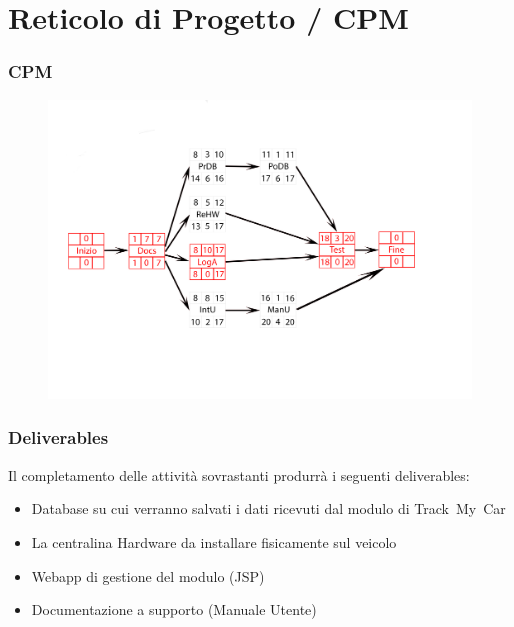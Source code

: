 \documentclass[a4paper,12pt]{beamer}
\begin{document}
\section{Reticolo di Progetto / CPM}
\begin{frame}
\frametitle{CPM}
\begin{figure}[htbp]
\centering
\includegraphics[trim={1cm 4.5cm 3.5cm 2.5cm}, clip, scale=0.3]{../ProjectPlan/CPM.png}
\end{figure}
\end{frame}

\begin{frame}
\frametitle{Deliverables}
Il completamento delle attività sovrastanti produrrà i seguenti deliverables:
\begin{itemize}
\item Database su cui verranno salvati i dati ricevuti dal modulo di Track~My~Car
\item La centralina Hardware da installare fisicamente sul veicolo
\item Webapp di gestione del modulo (JSP)
\item Documentazione a supporto (Manuale Utente)
\end{itemize}
\end{frame}

\pagebreak
\end{document}
